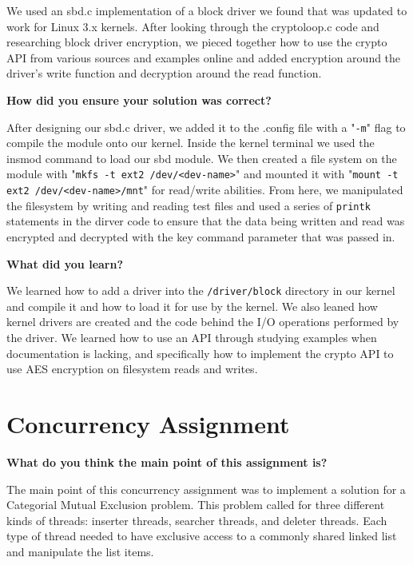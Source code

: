 \documentclass[10pt,letterpaper,draftclsnofoot,onecolumn]{IEEEtran}
\begin{document}
\noindent We used an sbd.c implementation of a block driver we found that was updated to work for Linux 3.x kernels. After looking through the cryptoloop.c code and researching block driver encryption, we pieced together how to use the crypto API from various sources and examples online and added encryption around the driver's write function and decryption around the read function.

\bigskip

\noindent\textbf{How did you ensure your solution was correct?}
\medskip

\medskip

\noindent After designing our sbd.c driver, we added it to the .config file with a "\texttt{-m}" flag to compile the module onto our kernel. Inside the kernel terminal we used the insmod command to load our sbd module. We then created a file system on the module with "\texttt{mkfs -t ext2 /dev/\textless dev-name\textgreater}" and mounted it with "\texttt{mount -t ext2 /dev/\textless dev-name\textgreater /mnt}" for read/write abilities. From here, we manipulated the filesystem by writing and reading test files and used a series of \texttt{printk} statements in the dirver code to ensure that the data being written and read was encrypted and decrypted with the key command parameter that was passed in.

\bigskip

\noindent\textbf{What did you learn?}
\medskip

\medskip

\noindent We learned how to add a driver into the \texttt{/driver/block} directory in our kernel and compile it and how to load it for use by the kernel. We also leaned how kernel drivers are created and the code behind the I/O operations performed by the driver. We learned how to use an API through studying examples when documentation is lacking, and specifically how to implement the crypto API to use AES encryption on filesystem reads and writes.

\bigskip

\section{Concurrency Assignment}
\bigskip

\noindent\textbf{What do you think the main point of this assignment is?}
\medskip

\medskip

\noindent The main point of this concurrency assignment was to implement a solution for a Categorial Mutual Exclusion problem. This problem called for three different kinds of threads: inserter threads, searcher threads, and deleter threads. Each type of thread needed to have exclusive access to a commonly shared linked list and manipulate the list items.
\end{document}
